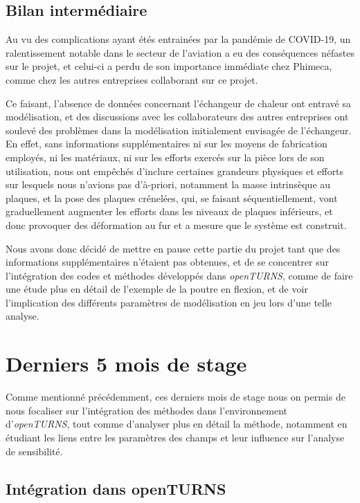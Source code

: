 \documentclass[a4paper,10pt]{article}
\begin{document}
\subsection{Bilan intermédiaire}

Au vu des complications ayant étés entrainées par la pandémie de COVID-19, un ralentissement notable dans le secteur de l'aviation a eu des conséquences néfastes sur le projet, et celui-ci a perdu de son importance immédiate chez Phimeca, comme chez les autres entreprises collaborant sur ce projet. \par \smallskip

Ce faisant, l'absence de données concernant l'échangeur de chaleur ont entravé sa modélisation, et des discussions avec les collaborateurs des autres entreprises ont soulevé des problèmes dans la modélisation initialement envisagée de l'échangeur. En effet, sans informations supplémentaires ni sur les moyens de fabrication employés, ni les matériaux, ni sur les efforts exercés sur la pièce lors de son utilisation, nous ont empêchés d'inclure certaines grandeurs physiques et efforts sur lesquels nous n'avions pas d'à-priori, notamment la masse intrinsèque au plaques, et la pose des plaques crénelées, qui, se faisant séquentiellement, vont graduellement augmenter les efforts dans les niveaux de plaques inférieurs, et donc provoquer des déformation au fur et a mesure que le système est construit. \par \smallskip

Nous avons donc décidé de mettre en pause cette partie du projet tant que des informations supplémentaires n'étaient pas obtenues, et de se concentrer sur l'intégration des codes et méthodes développés dans \textit{openTURNS}, comme de faire une étude plus en détail de l’exemple de la poutre en flexion, et de voir l'implication des différents paramètres de modélisation en jeu lors d'une telle analyse. \newpage

\section{Derniers 5 mois de stage }
Comme mentionné précédemment, ces derniers mois de stage nous on permis de nous focaliser sur l'intégration des méthodes dans l'environnement d'\textit{openTURNS}, tout comme d'analyser plus en détail la méthode, notamment en étudiant les liens entre les paramètres des champs et leur influence sur l'analyse de sensibilité.

\subsection{Intégration dans openTURNS}
\end{document}
